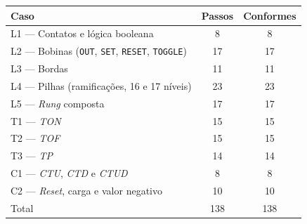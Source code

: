 \begin{tabelafixa}
    \centering
    \label{tab:resultados-logica}
    \begin{tabular}{p{8.2cm}cc}
        \hline
        Caso & Passos & Conformes \\
        \hline
        L1 --- Contatos e lógica booleana & 8 & 8 \\
        L2 --- Bobinas (\texttt{OUT}, \texttt{SET}, \texttt{RESET}, \texttt{TOGGLE}) & 17 & 17 \\
        L3 --- Bordas & 11 & 11 \\
        L4 --- Pilhas (ramificações, 16 e 17 níveis) & 23 & 23 \\
        L5 --- \textit{Rung} composta & 17 & 17 \\
        T1 --- \textit{TON} & 15 & 15 \\
        T2 --- \textit{TOF} & 15 & 15 \\
        T3 --- \textit{TP} & 14 & 14 \\
        C1 --- \textit{CTU}, \textit{CTD} e \textit{CTUD} & 8 & 8 \\
        C2 --- \textit{Reset}, carga e valor negativo & 10 & 10 \\
        \hline
        Total & 138 & 138 \\
        \hline
    \end{tabular}
    \vspace{14pt}
\end{tabelafixa}

